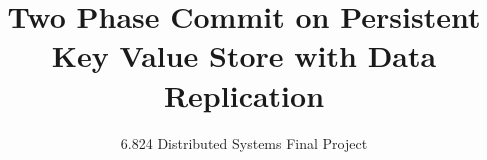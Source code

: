 \documentclass{vldb}
\begin{document}

\title{Two Phase Commit on Persistent Key Value Store with Data Replication}

\subtitle{6.824 Distributed Systems Final Project}


%
%
%
%

\end{document}
